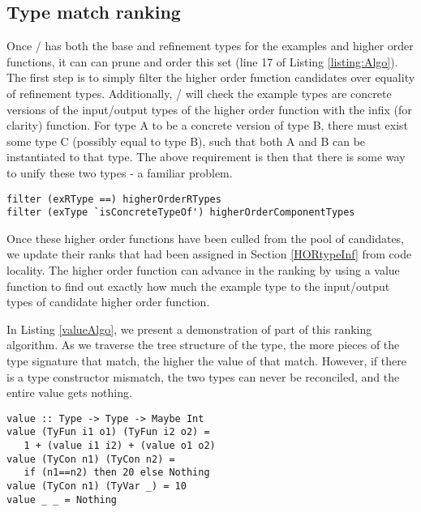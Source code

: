 \subsection{Type match ranking}\label{typeMatch}

Once \ourTool/ has both the base and refinement types for the examples and higher order functions, it can can prune and order this set (line 17 of Listing \ref{listing:Algo}).
The first step is to simply filter the higher order function candidates over equality of refinement types.
Additionally, \ourTool/ will check the example types are concrete versions of the input/output types of the higher order function with the infix (for clarity)  function.
For type A to be a concrete version of type B, there must exist some type C (possibly equal to type B), such that both A and B can be instantiated to that type.
The above requirement is then that there is some way to unify these two types - a familiar problem\cite{typeUnif}.

\begin{lstlisting}[caption=Pruning based on types]
filter (exRType ==) higherOrderRTypes
filter (exType `isConcreteTypeOf') higherOrderComponentTypes
\end{lstlisting}

Once these higher order functions have been culled from the pool of candidates, we update their ranks that had been assigned in Section \ref{HORtypeInf} from code locality.
The higher order function can advance in the ranking by using a value function to find out exactly how much the example type  to the input/output types of candidate higher order function.

In Listing \ref{valueAlgo}, we present a demonstration of part of this ranking algorithm.
As we traverse the tree structure of the type, the more pieces of the type signature that match, the higher the value of that match. 
However, if there is a type constructor mismatch, the two types can never be reconciled, and the entire value gets nothing.

\begin{lstlisting}[caption=Type closeness ranking algorithm (sample),label=valueAlgo]
value :: Type -> Type -> Maybe Int
value (TyFun i1 o1) (TyFun i2 o2) =
   1 + (value i1 i2) + (value o1 o2)
value (TyCon n1) (TyCon n2) =
   if (n1==n2) then 20 else Nothing
value (TyCon n1) (TyVar _) = 10
value _ _ = Nothing
\end{lstlisting}

